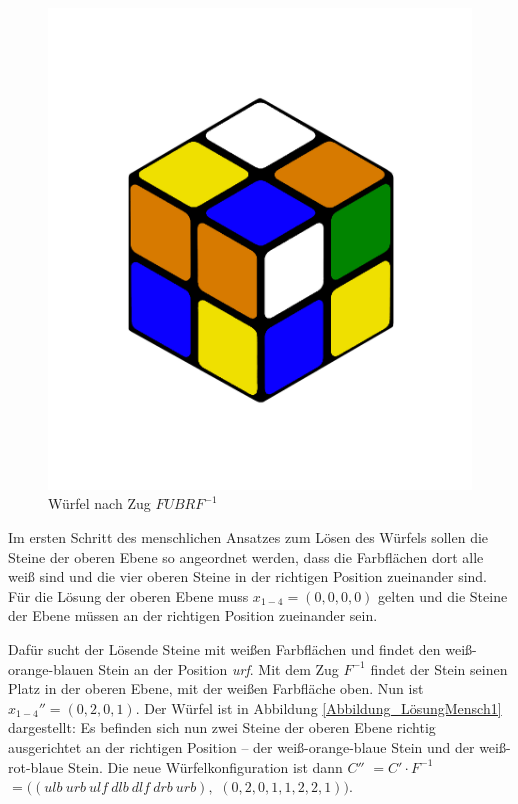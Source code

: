 \documentclass[12pt,a4paper, usenames, dvipsnames]{article}
\theoremstyle{mystyle}
\theoremstyle{definition}
\begin{document}
\begin{figure}[H]
\centering
\includegraphics[scale=0.12]{LURFL1.png}
\caption{Würfel nach Zug $FUBRF^{-1}$ }
\label{Abbildung_LösungMensch0}
\end{figure}

Im ersten Schritt des menschlichen Ansatzes zum Lösen des Würfels sollen die Steine der oberen Ebene so angeordnet werden, dass die Farbflächen dort alle weiß sind und die vier oberen Steine in der richtigen Position zueinander sind. 
Für die Lösung der oberen Ebene muss $x_{1-4} = (0,0,0,0)$ gelten und die Steine der Ebene müssen an der richtigen Position zueinander sein.

Dafür sucht der Lösende Steine mit weißen Farbflächen und findet den weiß-orange-blauen Stein an der Position \textit{urf}. 
Mit dem Zug $F^{-1}$ findet der Stein seinen Platz in der oberen Ebene, mit der weißen Farbfläche oben. 
Nun ist $x_{1-4}''=(0,2,0,1)$. Der Würfel ist in Abbildung \ref{Abbildung_LösungMensch1} dargestellt: Es befinden sich nun zwei Steine der oberen Ebene richtig ausgerichtet an der richtigen Position -- der weiß-orange-blaue Stein und der weiß-rot-blaue Stein. Die neue Würfelkonfiguration ist dann $C'' $ $= C' \cdot F^{-1} $ $= ((\textit{ulb} \ \textit{urb} \ \textit{ulf} \ \textit{dlb} \ \textit{dlf} \ \textit{drb} \ \textit{urb}),$ $(0,2,0,1,1,2,2,1))$.
\end{document}
